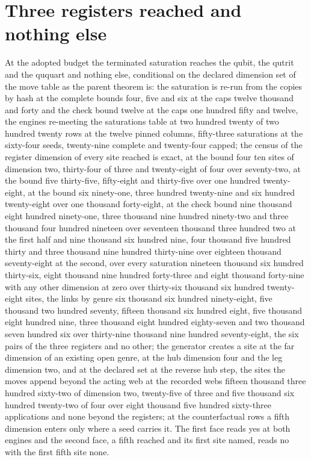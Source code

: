 \section{Three registers reached and nothing else}\label{mod:IV-8d-D542638-trgs-t1}
\begin{chtheorem}
At the adopted budget the terminated saturation reaches the qubit, the qutrit and the ququart and nothing else, conditional on the declared dimension set of the move table as the parent theorem is: the saturation is re-run from the copies by hash at the complete bounds four, five and six at the caps twelve thousand and forty and the check bound twelve at the caps one hundred fifty and twelve, the engines re-meeting the saturations table at two hundred twenty of two hundred twenty rows at the twelve pinned columns, fifty-three saturations at the sixty-four seeds, twenty-nine complete and twenty-four capped; the census of the register dimension of every site reached is exact, at the bound four ten sites of dimension two, thirty-four of three and twenty-eight of four over seventy-two, at the bound five thirty-five, fifty-eight and thirty-five over one hundred twenty-eight, at the bound six ninety-one, three hundred twenty-nine and six hundred twenty-eight over one thousand forty-eight, at the check bound nine thousand eight hundred ninety-one, three thousand nine hundred ninety-two and three thousand four hundred nineteen over seventeen thousand three hundred two at the first half and nine thousand six hundred nine, four thousand five hundred thirty and three thousand nine hundred thirty-nine over eighteen thousand seventy-eight at the second, over every saturation nineteen thousand six hundred thirty-six, eight thousand nine hundred forty-three and eight thousand forty-nine with any other dimension at zero over thirty-six thousand six hundred twenty-eight sites, the links by genre six thousand six hundred ninety-eight, five thousand two hundred seventy, fifteen thousand six hundred eight, five thousand eight hundred nine, three thousand eight hundred eighty-seven and two thousand seven hundred six over thirty-nine thousand nine hundred seventy-eight, the six pairs of the three registers and no other; the generator creates a site at the far dimension of an existing open genre, at the hub dimension four and the leg dimension two, and at the declared set at the reverse hub step, the sites the moves append beyond the acting web at the recorded webs fifteen thousand three hundred sixty-two of dimension two, twenty-five of three and five thousand six hundred twenty-two of four over eight thousand five hundred sixty-three applications and none beyond the registers; at the counterfactual rows a fifth dimension enters only where a seed carries it. The first face reads yes at both engines and the second face, a fifth reached and its first site named, reads no with the first fifth site none.
\end{chtheorem}
